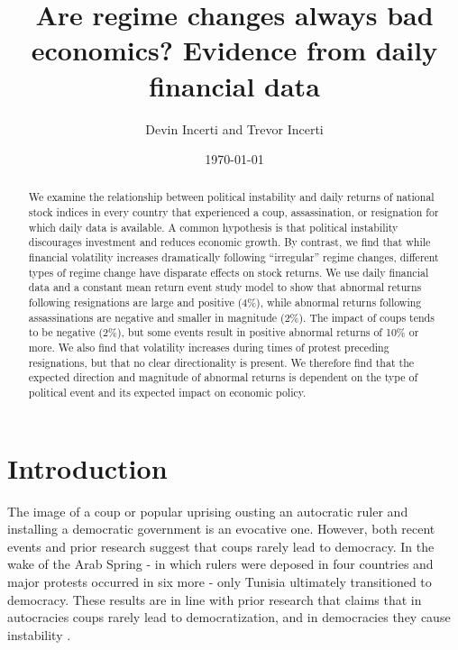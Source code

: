 \documentclass[12pt,final,fleqn]{article}
\theoremstyle{plain}
\begin{document}
\author{Devin Incerti and Trevor Incerti}
\title{\textbf{Are regime changes always bad economics? Evidence from daily financial data}}
\date{\today}
\maketitle

\singlespacing
\begin{abstract}
We examine the relationship between political instability and daily returns of national stock indices in every country that experienced a coup, assassination, or resignation for which daily data is available. A common hypothesis is that political instability discourages investment and reduces economic growth. By contrast, we find that while financial volatility increases dramatically following ``irregular'' regime changes, different types of regime change have disparate effects on stock returns. We use daily financial data and a constant mean return event study model to show that abnormal returns following resignations are large and positive (4\%), while abnormal returns following assassinations are negative and smaller in magnitude (2\%). The impact of coups tends to be negative (2\%), but some events result in positive abnormal returns of 10\% or more. We also find that volatility increases during times of protest preceding resignations, but that no clear directionality is present. We therefore find that the expected direction and magnitude of abnormal returns is dependent on the type of political event and its expected impact on economic policy.
\end{abstract}
\doublespacing

\section{Introduction} \label{sec:Introduction}

The image of a coup or popular uprising ousting an autocratic ruler and installing a democratic government is an evocative one. However, both recent events and prior research suggest that coups rarely lead to democracy. In the wake of the Arab Spring - in which rulers were deposed in four countries and major protests occurred in six more - only Tunisia ultimately transitioned to democracy. These results are in line with prior research that claims that in autocracies coups rarely lead to democratization, and in democracies they cause instability \citep{derpanopoulos2015coups, marinov2014coups, powell2011global, thyne2016coup, varol2011democratic}.
\end{document}
